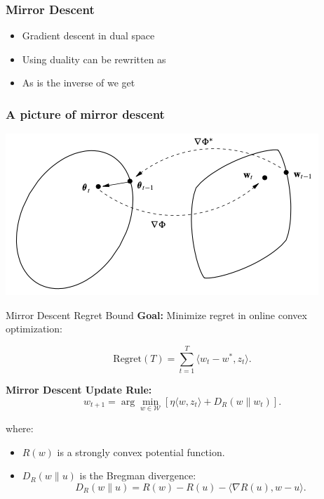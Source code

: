 \documentclass[handout]{beamer}
\begin{document}
\begin{small}
\begin{frame}
  \frametitle{Mirror Descent}
  \begin{itemize}
  \item Gradient descent in dual space
  \item Using duality can be rewritten as
  \item As \R{$\nabla \Phi$} is the inverse of \R{$\nabla \Phi^*$} we get
  \end{itemize}
\end{frame}

\begin{frame}
  \frametitle{A picture of mirror descent}
\includegraphics[width=\textwidth]{figures/MirrorDescent.png}
\end{frame}


\begin{frame}{Mirror Descent Regret Bound}
\textbf{Goal:} Minimize regret in online convex optimization:

\[
\text{Regret}(T) = \sum_{t=1}^{T} \langle w_t - w^*, z_t \rangle.
\]

\textbf{Mirror Descent Update Rule:}
\[
w_{t+1} = \arg\min_{w \in \mathcal{W}} \left[ \eta \langle w, z_t \rangle + D_R(w \| w_t) \right].
\]

where:
\begin{itemize}
    \item \( R(w) \) is a \textcolor{mathcolor}{strongly convex} potential function.
    \item \( D_R(w \| u) \) is the \textcolor{mathcolor}{Bregman divergence}:
    \[
    D_R(w \| u) = R(w) - R(u) - \langle \nabla R(u), w - u \rangle.
    \]
\end{itemize}
\end{frame}


\end{small}
\end{document}
